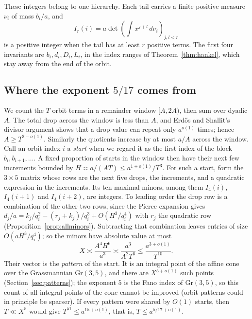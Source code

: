 \documentclass[11pt]{article}
\theoremstyle{definition}
\theoremstyle{remark}
\begin{document}
These integers belong to one hierarchy. Each tail carries a finite positive
measure $\nu_i$ of mass $b_i/a$, and
\[
 I_r(i)=a\det\left(\int x^{j+l}\,d\nu_i\right)_{j,l<r}
\]
is a positive integer when the tail has at least $r$ positive terms.
The first four invariants are $b_i,d_i,D_i,L_i$, in the index ranges of
Theorem~\ref{thm:hankel}, which stay away from the end of the orbit.

\subsection*{Where the exponent $5/17$ comes from}
We count the $T$ orbit terms in a remainder window $[A,2A)$, then sum over
dyadic $A$. The total drop across the window is less than $A$, and
Erd\H{o}s and Shallit's divisor argument shows that a drop value can repeat
only $a^{o(1)}$ times; hence $A\ge T^{2-o(1)}$. Similarly the quotients
increase by at most $a/A$ across the window. Call an orbit index $i$ a
\emph{start} when we regard it as the first index of the block
$b_i,b_{i+1},\dots$. A fixed proportion of starts in the window then have
their next few increments bounded by $H\asymp a/(AT)\le a^{1+o(1)}/T^3$.
For such a start, form the $3\times5$ matrix whose rows are the next five
drops, the increments, and a quadratic expression in the increments. Its ten
maximal minors, among them $I_4(i)$, $I_4(i+1)$ and $I_4(i+2)$, are integers.
To leading order the drop row is a combination of the other two rows, since
the Pierce expansion gives $d_j/a=k_j/q_i^2-(r_j+k_j)/q_i^3+O(H^3/q_i^4)$ with
$r_j$ the quadratic row (Proposition~\ref{prop:allminors}). Subtracting that
combination leaves entries of size $O(aH^3/q_i^4)$; so the
minors have absolute value at most
\[
 X\asymp\frac{A^4H^6}{a^3}\asymp\frac{a^3}{A^2T^6}\le\frac{a^{3+o(1)}}{T^{10}}.
\]
Their vector is the \emph{pattern} of the start. It is an integral point of
the affine cone over the Grassmannian $\mathrm{Gr}(3,5)$, and there are
$X^{5+o(1)}$ such points (Section~\ref{sec:patterns}); the exponent $5$ is
the Fano index of $\mathrm{Gr}(3,5)$, so this count of all integral points of
the cone cannot be improved (orbit patterns could in principle be sparser). If
every pattern were shared by $O(1)$ starts, then $T\ll X^5$ would give
$T^{51}\le a^{15+o(1)}$, that is, $T\le a^{5/17+o(1)}$.
\end{document}
